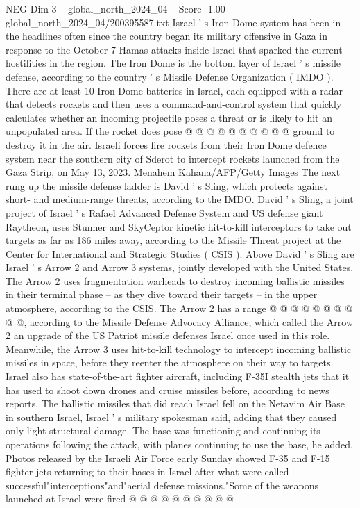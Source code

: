 \begin{textsample}{NEG Dim 3 – global\_north\_2024\_04 – Score -1.00 – global\_north\_2024\_04/200395587.txt}
Israel ' s Iron Dome system has been in the headlines often since the country began its military offensive in Gaza in response to the October 7 Hamas attacks inside Israel that sparked the current hostilities in the region.
The Iron Dome is the bottom layer of Israel ' s missile defense, according to the country ' s Missile Defense Organization ( IMDO ).
There are at least 10 Iron Dome batteries in Israel, each equipped with a radar that detects rockets and then uses a command-and-control system that quickly calculates whether an incoming projectile poses a threat or is likely to hit an unpopulated area.
If the rocket does pose @ @ @ @ @ @ @ @ @ @ ground to destroy it in the air.
Israeli forces fire rockets from their Iron Dome defence system near the southern city of Sderot to intercept rockets launched from the Gaza Strip, on May 13, 2023.
Menahem Kahana/AFP/Getty Images The next rung up the missile defense ladder is David ' s Sling, which protects against short- and medium-range threats, according to the IMDO.
David ' s Sling, a joint project of Israel ' s Rafael Advanced Defense System and US defense giant Raytheon, uses Stunner and SkyCeptor kinetic hit-to-kill interceptors to take out targets as far as 186 miles away, according to the Missile Threat project at the Center for International and Strategic Studies ( CSIS ).
Above David ' s Sling are Israel ' s Arrow 2 and Arrow 3 systems, jointly developed with the United States.
The Arrow 2 uses fragmentation warheads to destroy incoming ballistic missiles in their terminal phase -- as they dive toward their targets -- in the upper atmosphere, according to the CSIS.
The Arrow 2 has a range @ @ @ @ @ @ @ @ @ @, according to the Missile Defense Advocacy Alliance, which called the Arrow 2 an upgrade of the US Patriot missile defenses Israel once used in this role.
Meanwhile, the Arrow 3 uses hit-to-kill technology to intercept incoming ballistic missiles in space, before they reenter the atmosphere on their way to targets.
Israel also has state-of-the-art fighter aircraft, including F-35I stealth jets that it has used to shoot down drones and cruise missiles before, according to news reports.
The ballistic missiles that did reach Israel fell on the Netavim Air Base in southern Israel, Israel ' s military spokesman said, adding that they caused only light structural damage.
The base was functioning and continuing its operations following the attack, with planes continuing to use the base, he added.
Photos released by the Israeli Air Force early Sunday showed F-35 and F-15 fighter jets returning to their bases in Israel after what were called successful"interceptions"and"aerial defense missions."Some of the weapons launched at Israel were fired @ @ @ @ @ @ @ @ @ @

\end{textsample}
